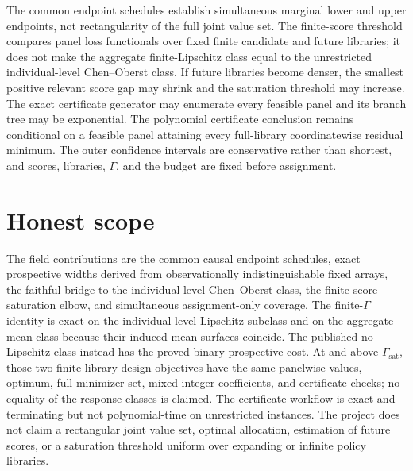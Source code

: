 \documentclass{article}
\begin{document}
The common endpoint schedules establish simultaneous marginal lower and upper endpoints, not rectangularity of the full joint value set. The finite-score threshold compares panel loss functionals over fixed finite candidate and future libraries; it does not make the aggregate finite-Lipschitz class equal to the unrestricted individual-level Chen--Oberst class. If future libraries become denser, the smallest positive relevant score gap may shrink and the saturation threshold may increase. The exact certificate generator may enumerate every feasible panel and its branch tree may be exponential. The polynomial certificate conclusion remains conditional on a feasible panel attaining every full-library coordinatewise residual minimum. The outer confidence intervals are conservative rather than shortest, and scores, libraries, \(\Gamma\), and the budget are fixed before assignment.

\section{Honest scope}

The field contributions are the common causal endpoint schedules, exact prospective widths derived from observationally indistinguishable fixed arrays, the faithful bridge to the individual-level Chen--Oberst class, the finite-score saturation elbow, and simultaneous assignment-only coverage. The finite-\(\Gamma\) identity is exact on the individual-level Lipschitz subclass and on the aggregate mean class because their induced mean surfaces coincide. The published no-Lipschitz class instead has the proved binary prospective cost. At and above \(\Gamma_{\mathrm{sat}}\), those two finite-library design objectives have the same panelwise values, optimum, full minimizer set, mixed-integer coefficients, and certificate checks; no equality of the response classes is claimed. The certificate workflow is exact and terminating but not polynomial-time on unrestricted instances. The project does not claim a rectangular joint value set, optimal allocation, estimation of future scores, or a saturation threshold uniform over expanding or infinite policy libraries.
\end{document}

